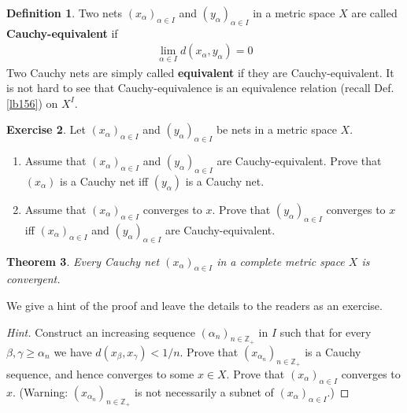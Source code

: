 \documentclass[12pt,b5paper,notitlepage]{article}
\theoremstyle{definition}
\newtheorem{df}{Definition}[section]
\newtheorem{exe}[df]{Exercise}
\theoremstyle{plain}
\newtheorem{thm}[df]{Theorem}
\newcommand{\Zbb}{\mathbb Z}
\numberwithin{equation}{section}
\begin{document}
\begin{df}\label{lb155}
Two nets $(x_\alpha)_{\alpha\in I}$ and $(y_\alpha)_{\alpha\in I}$ in a metric space $X$ are called \textbf{Cauchy-equivalent}  if
\begin{align*}
\lim_{\alpha\in I}d(x_\alpha,y_\alpha)=0
\end{align*}
Two Cauchy nets are simply called \textbf{equivalent} if they are Cauchy-equivalent. It is not hard to see that Cauchy-equivalence is an equivalence relation (recall Def. \ref{lb156}) on $X^I$.
\end{df}


\begin{exe}\label{lb128}
Let $(x_\alpha)_{\alpha\in I}$ and $(y_\alpha)_{\alpha\in I}$ be nets in a metric space $X$. 
\begin{enumerate}
\item Assume that $(x_\alpha)_{\alpha\in I}$ and $(y_\alpha)_{\alpha\in I}$ are Cauchy-equivalent. Prove that $(x_\alpha)$ is a Cauchy net iff $(y_\alpha)$ is a Cauchy net.
\item Assume that $(x_\alpha)_{\alpha\in I}$ converges to $x$. Prove that $(y_\alpha)_{\alpha\in I}$ converges to $x$ iff $(x_\alpha)_{\alpha\in I}$ and $(y_\alpha)_{\alpha\in I}$ are Cauchy-equivalent.
\end{enumerate}
\end{exe}



\begin{thm}\label{lb129}
Every Cauchy net $(x_\alpha)_{\alpha\in I}$ in a complete metric space $X$ is convergent.
\end{thm}

We give a hint of the proof and leave the details to the readers as an exercise.

\begin{proof}[Hint]
Construct an increasing sequence $(\alpha_n)_{n\in\Zbb_+}$ in $I$ such that for every $\beta,\gamma\geq\alpha_n$ we have $d(x_\beta,x_\gamma)<1/n$. Prove that $(x_{\alpha_n})_{n\in\Zbb_+}$ is a Cauchy sequence, and hence converges to some $x\in X$. Prove that $(x_\alpha)_{\alpha\in I}$ converges to $x$. (Warning: $(x_{\alpha_n})_{n\in\Zbb_+}$ is not necessarily a subnet of $(x_\alpha)_{\alpha\in I}$.)
\end{proof}
\end{document}
